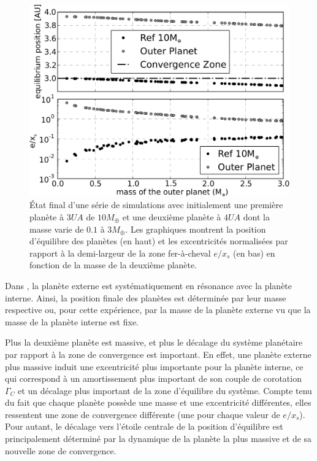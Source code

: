 \begin{figure}[htbp]
\centering
\includegraphics[width=0.95\linewidth]{figure/shifted/mass_ratio_influence.pdf}
\caption[Influence du rapport de masse sur le décalage de la zone d'équilibre d'un système résonnant.]{État final d'une série de
simulations avec initialement une première planète à $3\unit{UA}$ de $10\unit{M_\oplus}$ et une deuxième planète à $4\unit{UA}$
dont la masse varie de $0.1$ à $3\unit{M_\oplus}$. Les graphiques montrent la position d'équilibre des planètes (en haut) et les
excentricités normalisées par rapport à la demi-largeur de la zone fer-à-cheval $e/x_s$ (en bas) en fonction de la masse de la
deuxième planète.}\label{fig:mass_ratio_final_pos}
\end{figure}

\bigskip

Dans , la planète externe est systématiquement en résonance  avec la planète interne. Ainsi, la position finale des planètes est déterminée par leur masse respective ou, pour cette expérience, par la masse de la planète externe vu que la masse de la planète interne est fixe. 

Plus la deuxième planète est massive, et plus le décalage du système planétaire par rapport à la zone de convergence est
important. En effet, une planète externe plus massive induit une excentricité plus importante pour la planète interne, ce qui
correspond à un amortissement plus important de son couple de corotation $\Gamma_C$ et un décalage plus important de la zone
d'équilibre du système. Compte tenu du fait que chaque planète possède une masse et une excentricité différentes, elles
ressentent une zone de convergence différente (une pour chaque valeur de $e/x_s$). Pour autant, le décalage vers
l'étoile centrale de la position d'équilibre est principalement déterminé par la dynamique de la planète la plus massive et de
sa nouvelle zone de convergence.

